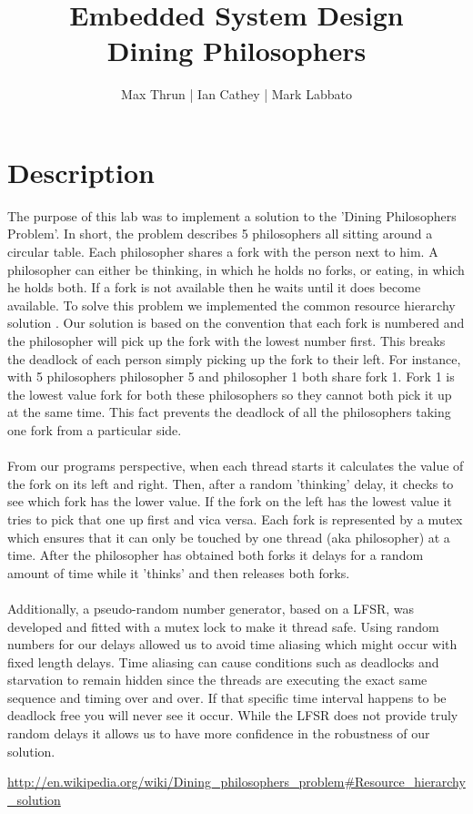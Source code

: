 \documentclass[12pt]{article}
\title{Embedded System Design \\ Dining Philosophers}
\author{ Max Thrun | Ian Cathey | Mark Labbato }
\begin{document}
\maketitle

\section*{Description}

The purpose of this lab was to implement a solution to the
'Dining Philosophers Problem'. In short, the problem describes
5 philosophers all sitting around a circular table. Each philosopher
shares a fork with the person next to him. A philosopher can either
be thinking, in which he holds no forks, or eating, in which he holds
both. If a fork is not available then he waits until it
does become available. To solve this problem we implemented the common
resource hierarchy solution \cite{sol}. Our solution is based on the
convention that each fork is numbered and the philosopher will pick up
the fork with the lowest number first. This breaks the deadlock of each
person simply picking up the fork to their left. For instance, with 5
philosophers philosopher 5 and philosopher 1 both share fork 1. Fork 1
is the lowest value fork for both these philosophers so they cannot both
pick it up at the same time. This fact prevents the deadlock of all the
philosophers taking one fork from a particular side.
\\\\
From our programs perspective, when each thread starts it calculates the
value of the fork on its left and right. Then, after a random 'thinking'
delay, it checks to see which fork has the lower value. If the fork on the
left has the lowest value it tries to pick that one up first and vica versa.
Each fork is represented by a mutex which ensures that it can only be touched
by one thread (aka philosopher) at a time. After the philosopher has obtained both
forks it delays for a random amount of time while it 'thinks' and then releases
both forks.
\\\\
Additionally, a pseudo-random number generator, based on a LFSR, was developed
and fitted with a mutex lock to make it thread safe. Using random numbers for our delays 
allowed us to avoid time aliasing which might occur with fixed length delays. Time aliasing 
can cause conditions such as deadlocks and starvation to remain hidden since the threads are
executing the exact same sequence and timing over and over. If that specific time interval
happens to be deadlock free you will never see it occur.  While the LFSR does not provide 
truly random delays it allows us to have more confidence in the robustness of our solution.

\begin{thebibliography}{9}
     \url{http://en.wikipedia.org/wiki/Dining_philosophers_problem#Resource_hierarchy_solution}
\end{thebibliography}
\end{document}
